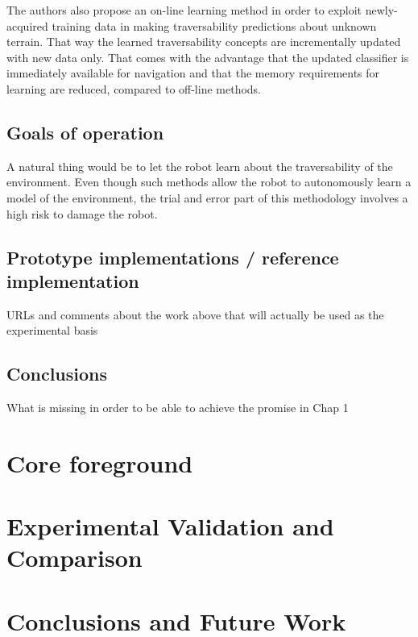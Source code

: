 \documentclass[12pt,a4paper]{report}
\begin{document}
	The authors also propose an on-line learning method in order to exploit 
	newly-acquired training data in making traversability predictions about 
	unknown terrain. That way the learned traversability concepts are 
	incrementally updated with new data only. That comes with the advantage that the 
	updated classifier is immediately available for navigation and that the 
	memory requirements for learning are reduced, compared to off-line methods.
	\\
	
	\section{Goals of operation}
	\label{sec:bg:goals}
	
	A natural thing would be to let the robot learn about the 
	traversability of the environment. Even though such methods allow the robot to 
	autonomously learn a model of the environment, the trial and error part of this 
	methodology involves a high risk to damage the robot.
	\\
	
	\section{Prototype implementations / reference implementation}
	\label{sec:bg:code}
	
	URLs and comments about the work above that will actually be used as 
	the experimental basis
	\\
	
	\section{Conclusions}
	\label{sec:bg:concl}
	
	What is missing in order to be able to achieve the promise in Chap 1
	
	
	\chapter{Core foreground}
	\label{sec:fg}
	
	\chapter{Experimental Validation and Comparison}
	\label{sec:exp}
	
	\chapter{Conclusions and Future Work}
	\label{sec:concl}
	
	\renewcommand{\bibname}{References}
	
	
\end{document}
